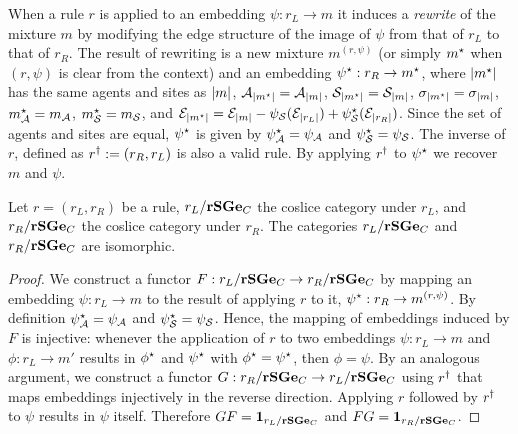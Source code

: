 When a rule $r$ is applied to an embedding $\psi: r_L \to m$
it induces a \emph{rewrite} of the mixture $m$
by modifying the edge structure of the image of $\psi$
from that of $r_L$ to that of $r_R$.
The result of rewriting is a new mixture $m^{(r,\psi)}$
(or simply $m^\star$ when $(r,\psi)$ is clear from the context)
and an embedding $\psi^\star: r_R \to m^\star$, where
$\left|m^\star\right|$ has the same agents and sites as $\left|m\right|$,
\ie $\mathcal{A}_{\left|m^\star\right|} = \mathcal{A}_{\left|m\right|}$,
$\mathcal{S}_{\left|m^\star\right|} = \mathcal{S}_{\left|m\right|}$,
$\sigma_{\left|m^\star\right|} = \sigma_{\left|m\right|}$,
$m^\star_{\mathcal{A}} = m_{\mathcal{A}}$,
$m^\star_{\mathcal{S}} = m_{\mathcal{S}}$,
and $\mathcal{E}_{\left|m^\star\right|} = \mathcal{E}_{\left|m\right|} -
\psi_{\mathcal{S}}(\mathcal{E}_{\left|r_L\right|}) +
\psi^\star_{\mathcal{S}}(\mathcal{E}_{\left|r_R\right|})$.
Since the set of agents and sites are equal,
$\psi^\star$ is given by
$\psi^\star_{\mathcal{A}} = \psi_{\mathcal{A}}$ and
$\psi^\star_{\mathcal{S}} = \psi_{\mathcal{S}}$.
The inverse of $r$,
defined as $r^\dagger := (r_R,r_L)$ is also a valid rule.
By applying $r^\dagger$ to $\psi^\star$
we recover $m$ and $\psi$.

\begin{lemma}
  \label{lemma:reversibility}
  Let $r = (r_L, r_R)$ be a rule,
  $r_L/\mathbf{rSGe}_C$ the coslice category under $r_L$, and
  $r_R/\mathbf{rSGe}_C$ the coslice category under $r_R$.
  The categories $r_L/\mathbf{rSGe}_C$ and $r_R/\mathbf{rSGe}_C$ are isomorphic.
\end{lemma}
\begin{proof}
  We construct a functor $F: r_L/\mathbf{rSGe}_C \to r_R/\mathbf{rSGe}_C$
  by mapping an embedding $\psi: r_L \to m$
  to the result of applying $r$ to it,
  $\psi^\star: r_R \to m^{(r,\psi)}$.
  By definition $\psi^\star_{\mathcal{A}} = \psi_{\mathcal{A}}$ and
  $\psi^\star_{\mathcal{S}} = \psi_{\mathcal{S}}$.
  Hence, the mapping of embeddings induced by $F$ is injective:
  whenever the application of $r$ to two embeddings
  $\psi: r_L \to m$ and $\phi: r_L \to m'$
  results in $\phi^\star$ and $\psi^\star$
  with $\phi^\star = \psi^\star$,
  then $\phi = \psi$.
  By an analogous argument, we construct a functor
  $G: r_R/\mathbf{rSGe}_C \to r_L/\mathbf{rSGe}_C$ using $r^\dagger$ that
  maps embeddings injectively in the reverse direction.
  Applying $r$ followed by $r^\dagger$ to $\psi$
  results in $\psi$ itself.
  Therefore $GF = \boldsymbol{\mathbf{1}}_{r_L/\mathbf{rSGe}_C}$ and $FG = \boldsymbol{\mathbf{1}}_{r_R/\mathbf{rSGe}_C}$.
\end{proof}

